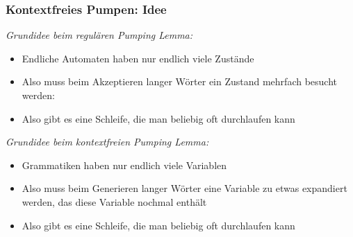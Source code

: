 \documentclass[aspectratio=1610,onlymath]{beamer}
\begin{document}
\begin{frame}\frametitle{Kontextfreies Pumpen: Idee}

\emph{Grundidee beim regulären Pumping Lemma:}
\begin{itemize}
\item Endliche Automaten haben nur endlich viele Zustände
\item Also muss beim Akzeptieren langer Wörter ein Zustand mehrfach besucht werden:\\
\item Also gibt es eine Schleife, die man beliebig oft durchlaufen kann
\end{itemize}
\bigskip\pause

\emph{Grundidee beim kontextfreien Pumping Lemma:}
\begin{itemize}
\item Grammatiken haben nur endlich viele Variablen
\item Also muss beim Generieren langer Wörter eine Variable zu etwas expandiert werden, das diese Variable nochmal enthält\ghost{:}\\
\item Also gibt es eine Schleife, die man beliebig oft durchlaufen kann
\end{itemize}

\end{frame}
\end{document}

